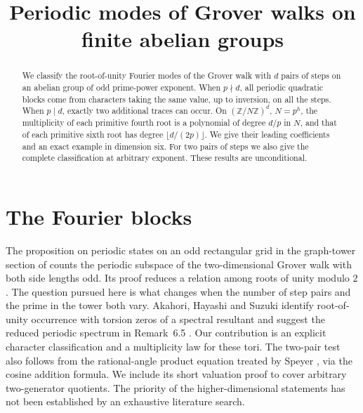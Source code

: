\documentclass[10pt]{article}
\title{Periodic modes of Grover walks on finite abelian groups}
\author{}
\date{}
\newcommand{\Z}{\mathbb Z}
\begin{document}
\maketitle
\vspace{-2.3em}
\begin{abstract}
We classify the root-of-unity Fourier modes of the Grover walk with $d$
pairs of steps on an abelian group of odd prime-power exponent. When
$p\nmid d$, all periodic quadratic blocks come from characters taking
the same value, up to inversion, on all the steps. When $p\mid d$, exactly
two additional traces can occur. On $(\Z/N\Z)^d$, $N=p^h$, the
multiplicity of each primitive fourth root is a polynomial of degree $d/p$
in $N$, and that of each primitive sixth root has degree $\lfloor d/(2p)\rfloor$.
We give their leading coefficients and an exact example in dimension six.
For two pairs of steps we also give the complete classification at arbitrary
exponent. These results are unconditional.
\end{abstract}
\section{The Fourier blocks}
The proposition on periodic states on an odd rectangular grid in
the graph-tower section of \cite{repo} counts the periodic subspace of
the two-dimensional Grover walk with both side lengths odd. Its proof
reduces a relation among roots of unity modulo $2$. The question pursued
here is what changes when the number of step pairs and the prime in the
tower both vary. Akahori, Hayashi and Suzuki identify root-of-unity
occurrence with torsion zeros of a spectral resultant and suggest the
reduced periodic spectrum in Remark~6.5 \cite{ahs}. Our contribution is an
explicit character classification and a multiplicity law for these tori.
The two-pair test also follows from the rational-angle product equation
treated by Speyer \cite{speyer}, via the cosine addition formula. We include
its short valuation proof to cover arbitrary two-generator quotients.
The priority of the higher-dimensional statements has not been established
by an exhaustive literature search.
\end{document}
